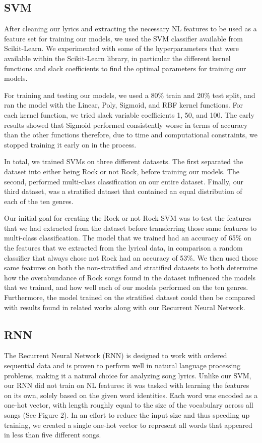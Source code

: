 \documentclass[journal]{IEEEtran}
\begin{document}
\subsection{SVM}

After cleaning our lyrics and extracting the necessary NL features to be used as a feature set for training our models, we used the SVM classifier available from Scikit-Learn. We experimented with some of the hyperparameters that were available within the Scikit-Learn library, in particular the different kernel functions and slack coefficients to find the optimal parameters for training our models.

For training and testing our models, we used a 80\% train and 20\% test split, and ran the model with the Linear, Poly, Sigmoid, and RBF kernel functions. For each kernel function, we tried slack variable coefficients 1, 50, and 100. The early results showed that Sigmoid performed consistently worse in terms of accuracy than the other functions therefore, due to time and computational constraints, we stopped training it early on in the process.

	In total, we trained SVMs on three different datasets. The first separated the dataset into either being Rock or not Rock, before training our models. The second, performed multi-class classification on our entire dataset. Finally, our third dataset, was a stratified dataset that contained an equal distribution of each of the ten genres.
	
	Our initial goal for creating the Rock or not Rock SVM was to test the features that we had extracted from the dataset before transferring those same features to multi-class classification. The model that we trained had an accuracy of 65\% on the features that we extracted from the lyrical data, in comparison a random classifier that always chose not Rock had an accuracy of 53\%. We then used those same features on both the non-stratified and stratified datasets to both determine how the overabundance of Rock songs found in the dataset influenced the models that we trained, and how well each of our models performed on the ten genres. Furthermore, the model trained on the stratified dataset could then be compared with results found in related works along with our Recurrent Neural Network.  

\subsection{RNN}

The Recurrent Neural Network (RNN) is designed to work with ordered sequential data and is proven to perform well in natural language processing problems, making it a natural choice for analyzing song lyrics. Unlike our SVM, our RNN did not train on NL features: it was tasked with learning the features on its own, solely based on the given word identities. Each word was encoded as a one-hot vector, with length roughly equal to the size of the vocabulary across all songs (See Figure 2). In an effort to reduce the input size and thus speeding up training, we created a single one-hot vector to represent all words that appeared in less than five different songs.
\end{document}
